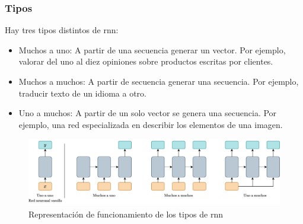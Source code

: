 \subsubsection{Tipos}
Hay tres tipos distintos de \acrshort{rnn}:
\begin{itemize}
    \item Muchos a uno: A partir de una secuencia generar un vector. Por ejemplo, valorar del uno al diez opiniones sobre productos escritas por clientes.
    \item Muchos a muchos: A partir de secuencia generar una secuencia. Por ejemplo, traducir texto de un idioma a otro.
    \item Uno a muchos: A partir de un solo vector se genera una secuencia. Por ejemplo, una red especializada en describir los elementos de una imagen.
\end{itemize}

\begin{figure}[H]
    \centering
    \includegraphics[width=14cm]{images/state-of-art/rnn/rnn-types.png}
    \caption{Representación de funcionamiento de los tipos de \acrshort{rnn}}
    \label{fig:rnn_types}
\end{figure}
